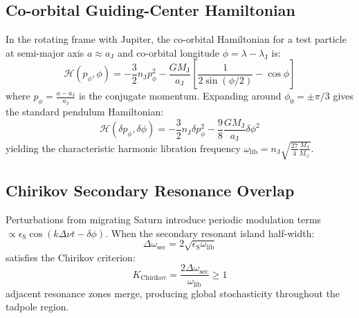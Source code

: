 \documentclass[11pt,a4paper]{article}
\begin{document}
\subsection{Co-orbital Guiding-Center Hamiltonian}
In the rotating frame with Jupiter, the co-orbital Hamiltonian for a test particle at semi-major axis $a \approx a_{\text{J}}$ and co-orbital longitude $\phi = \lambda - \lambda_{\text{J}}$ is:
\begin{equation}
\mathcal{H}(p_\phi, \phi) = -\frac{3}{2} n_{\text{J}} p_\phi^2 - \frac{G M_{\text{J}}}{a_{\text{J}}} \left[ \frac{1}{2\sin(\phi/2)} - \cos\phi \right]
\end{equation}
where $p_\phi = \frac{a - a_{\text{J}}}{a_{\text{J}}}$ is the conjugate momentum. Expanding around $\phi_0 = \pm \pi/3$ gives the standard pendulum Hamiltonian:
\begin{equation}
\mathcal{H}(\delta p_\phi, \delta\phi) = -\frac{3}{2} n_{\text{J}} \delta p_\phi^2 - \frac{9}{8} \frac{G M_{\text{J}}}{a_{\text{J}}} \delta\phi^2
\end{equation}
yielding the characteristic harmonic libration frequency $\omega_{\text{lib}} = n_{\text{J}} \sqrt{\frac{27}{4}\frac{M_{\text{J}}}{M_\odot}}$.

\subsection{Chirikov Secondary Resonance Overlap}
Perturbations from migrating Saturn introduce periodic modulation terms $\propto \epsilon_{\text{S}} \cos(k \Delta \nu t - \delta\phi)$. When the secondary resonant island half-width:
\begin{equation}
\Delta \omega_{\text{sec}} = 2 \sqrt{\epsilon_{\text{S}} \omega_{\text{lib}}}
\end{equation}
satisfies the Chirikov criterion:
\begin{equation}
K_{\text{Chirikov}} = \frac{2 \Delta \omega_{\text{sec}}}{\omega_{\text{lib}}} \ge 1
\end{equation}
adjacent resonance zones merge, producing global stochasticity throughout the tadpole region.
\end{document}
